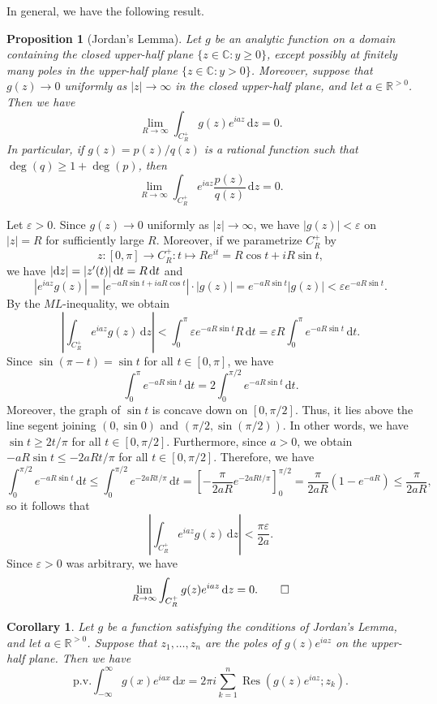 \documentclass[10pt]{article}
\makeatletter
\newcommand{\eps}{\varepsilon}
\newcommand{\R}{\mathbb{R}}
\newcommand{\C}{\mathbb{C}}
\newcommand{\dd}{\,\mathrm{d}}
\newcommand{\pv}{\text{p.v.}}
\DeclareMathOperator{\Res}{Res}
\theoremstyle{newstyle}
\newtheorem{cor}[thm]{Corollary}
\newtheorem{prop}[thm]{Proposition}
\newenvironment{pf}[1][\proofname]{\par
  \pushQED{\qed}%
  \normalfont \topsep0\p@\relax
  \trivlist
  \item[\hskip\labelsep\scshape
  #1\@addpunct{.}]\ignorespaces
}{%
  \popQED\endtrivlist\@endpefalse
}
\makeatother
\begin{document}
\newpage 
In general, we have the following result. 

\begin{prop}[Jordan's Lemma]
Let $g$ be an analytic function on a domain containing the closed upper-half plane 
$\{z \in \C : y \geq 0\}$, except possibly at finitely many poles in the upper-half plane 
$\{z \in \C : y > 0\}$. Moreover, suppose that $g(z) \to 0$ uniformly as 
$|z| \to \infty$ in the closed upper-half plane, and let $a \in \R^{>0}$. Then we have 
\[ \lim_{R\to\infty} \int_{C_R^+} g(z)e^{iaz}\dd z = 0. \]
In particular, if $g(z) = p(z)/q(z)$ is a rational function such that $\deg(q) \geq 1 + \deg(p)$, then 
\[ \lim_{R\to\infty} \int_{C_R^+} e^{iaz} \frac{p(z)}{q(z)}\dd z = 0. \]
\end{prop}
\begin{pf}
Let $\eps > 0$. Since $g(z) \to 0$ uniformly as $|z| \to \infty$, we have $|g(z)| < \eps$ on 
$|z| = R$ for sufficiently large $R$. Moreover, if we parametrize $C_R^+$ by 
\[ z : [0, \pi] \to C_R^+ : t \mapsto Re^{it} = R\cos t + iR\sin t, \]
we have $|{\rm d}z| = |z'(t)|\dd t = R\dd t$ and 
\[ |e^{iaz}g(z)| = |e^{-aR\sin t + iaR\cos t}| \cdot |g(z)| = 
e^{-aR\sin t} |g(z)| < \eps e^{-aR\sin t}. \]
By the $ML$-inequality, we obtain 
\[ \left| \int_{C_R^+} e^{iaz}g(z)\dd z \right| < \int_0^\pi \eps e^{-aR\sin t}R\dd t = 
\eps R \int_0^\pi e^{-aR\sin t}\dd t. \]
Since $\sin(\pi - t) = \sin t$ for all $t \in [0, \pi]$, we have 
\[ \int_0^\pi e^{-aR\sin t}\dd t = 2 \int_0^{\pi/2} e^{-aR\sin t}\dd t. \]
Moreover, the graph of $\sin t$ is concave down on $[0, \pi/2]$. Thus, it lies 
above the line segent joining $(0, \sin0)$ and $(\pi/2, \sin(\pi/2))$. In other words, we have 
$\sin t \geq 2t/\pi$ for all $t \in [0, \pi/2]$. Furthermore, since $a > 0$, we obtain 
$-aR\sin t \leq -2aRt/\pi$ for all $t \in [0, \pi/2]$. Therefore, we have 
\[ \int_0^{\pi/2} e^{-aR\sin t}\dd t \leq \int_0^{\pi/2} e^{-2aRt/\pi}\dd t = 
\left[ -\frac{\pi}{2aR} e^{-2aRt/\pi} \right]_0^{\pi/2} = \frac{\pi}{2aR} (1-e^{-aR}) 
\leq \frac{\pi}{2aR}, \]
so it follows that 
\[ \left| \int_{C_R^+} e^{iaz} g(z)\dd z \right| < \frac{\pi\eps}{2a}. \]
Since $\eps > 0$ was arbitrary, we have 
\[ \lim_{R\to\infty} \int_{C_R^+} g(z)e^{iaz} \dd z = 0. \qedhere \]
\end{pf}

\begin{cor}
Let $g$ be a function satisfying the conditions of Jordan's Lemma, and let $a \in \R^{>0}$. 
Suppose that $z_1, \dots, z_n$ are the poles of $g(z)e^{iaz}$ on the upper-half plane. Then we have 
\[ \pv\int_{-\infty}^\infty g(x) e^{iax} \dd x = 2\pi i \sum_{k=1}^n \Res(g(z)e^{iaz}; z_k). \]
\end{cor}
\end{document}
